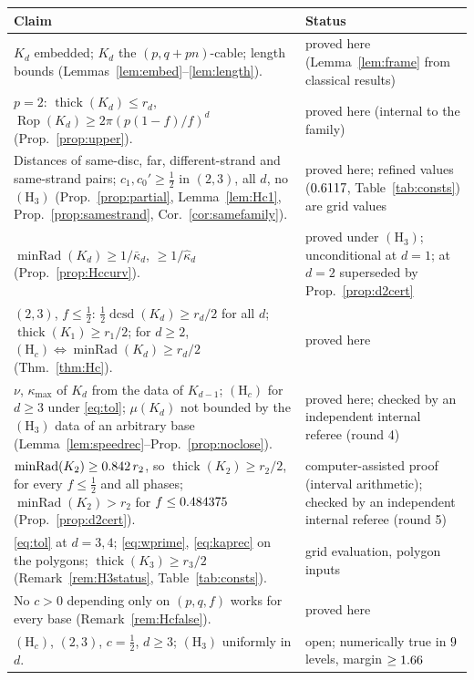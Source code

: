 \documentclass[10pt,a4paper]{article}
\theoremstyle{plain}
\theoremstyle{definition}
\theoremstyle{remark}
\newcommand{\thick}{\operatorname{thick}}
\newcommand{\Rop}{\operatorname{Rop}}
\newcommand{\minRad}{\operatorname{minRad}}
\newcommand{\dcsd}{\operatorname{dcsd}}
\begin{document}
{\footnotesize
\begin{longtable}{@{}p{}p{}@{}}\toprule
Claim & Status\\\midrule\endhead
$K_d$ embedded; $K_d$ the $(p,q+pn)$-cable; length bounds (Lemmas~\ref{lem:embed}--\ref{lem:length}). & proved here (Lemma~\ref{lem:frame} from classical results)\\
$p=2$: $\thick(K_d)\le r_d$, $\Rop(K_d)\ge2\pi(p(1-f)/f)^d$ (Prop.~\ref{prop:upper}). & proved here (internal to the family)\\
Distances of same-disc, far, different-strand and same-strand pairs; $c_1,c_0'\ge\frac12$ in $(2,3)$, all $d$, no $(\mathrm H_3)$ (Prop.~\ref{prop:partial}, Lemma~\ref{lem:Hc1}, Prop.~\ref{prop:samestrand}, Cor.~\ref{cor:samefamily}). & proved here; refined values ($0.6117$, Table~\ref{tab:consts}) are grid values\\
$\minRad(K_d)\ge1/\bar\kappa_d$, $\ge1/\hat\kappa_d$ (Prop.~\ref{prop:Hccurv}). & proved under $(\mathrm H_3)$; unconditional at $d=1$; at $d=2$ superseded by Prop.~\ref{prop:d2cert}\\
$(2,3)$, $f\le\frac12$: $\frac12\dcsd(K_d)\ge r_d/2$ for all $d$; $\thick(K_1)\ge r_1/2$; for $d\ge2$, $(\mathrm H_c)\Leftrightarrow\minRad(K_d)\ge r_d/2$ (Thm.~\ref{thm:Hc}). & proved here\\
$\nu$, $\kappa_{\max}$ of $K_d$ from the data of $K_{d-1}$; $(\mathrm H_c)$ for $d\ge3$ under \eqref{eq:tol}; $\mu(K_d)$ not bounded by the $(\mathrm H_3)$ data of an arbitrary base (Lemma~\ref{lem:speedrec}--Prop.~\ref{prop:noclose}). & proved here; checked by an independent internal referee (round 4)\\
$\minRad(K_2)\ge\DtwoCertMinRad\,r_2$, so $\thick(K_2)\ge r_2/2$, for every $f\le\frac12$ and all phases; $\minRad(K_2)>r_2$ for $f\le0.484375$ (Prop.~\ref{prop:d2cert}). & computer-assisted proof (interval arithmetic); checked by an independent internal referee (round 5)\\
\eqref{eq:tol} at $d=3,4$; \eqref{eq:wprime}, \eqref{eq:kaprec} on the polygons; $\thick(K_3)\ge r_3/2$ (Remark~\ref{rem:H3status}, Table~\ref{tab:consts}). & grid evaluation, polygon inputs\\
No $c>0$ depending only on $(p,q,f)$ works for every base (Remark~\ref{rem:Hcfalse}). & proved here\\
$(\mathrm H_c)$, $(2,3)$, $c=\frac12$, $d\ge3$; $(\mathrm H_3)$ uniformly in $d$. & open; numerically true in $9$ levels, margin $\ge1.66$\\

\end{longtable}}
\end{document}
